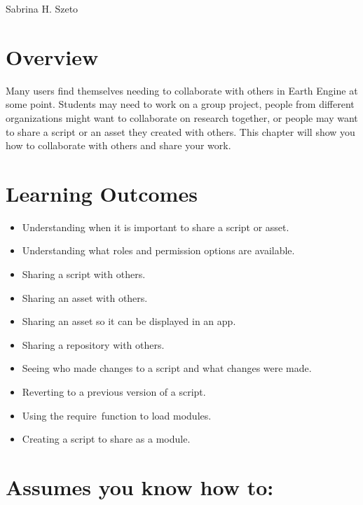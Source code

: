 \documentclass[
  letterpaper,
  DIV=11,
  numbers=noendperiod]{scrreprt}
\providecommand{\tightlist}{%
  \setlength{\itemsep}{0pt}\setlength{\parskip}{0pt}}\usepackage{longtable,booktabs,array}
\begin{document}

Sabrina H. Szeto

\hypertarget{overview-21}{%
\section*{Overview}\label{overview-21}}


Many users find themselves needing to collaborate with others in Earth
Engine at some point. Students may need to work on a group project,
people from different organizations might want to collaborate on
research together, or people may want to share a script or an asset they
created with others. This chapter will show you how to collaborate with
others and share your work.

\hypertarget{learning-outcomes-21}{%
\section*{Learning Outcomes}\label{learning-outcomes-21}}


\begin{itemize}
\tightlist
\item
  Understanding when it is important to share a script or asset.
\item
  Understanding what roles and permission options are available.
\item
  Sharing a script with others.
\item
  Sharing an asset with others.
\item
  Sharing an asset so it can be displayed in an app.
\item
  Sharing a repository with others.
\item
  Seeing who made changes to a script and what changes were made.
\item
  Reverting to a previous version of a script.
\item
  Using the require~function to load modules.
\item
  Creating a script to share as a module.
\end{itemize}

\hypertarget{assumes-you-know-how-to-21}{%
\section*{Assumes you know how to:}\label{assumes-you-know-how-to-21}}
\end{document}
